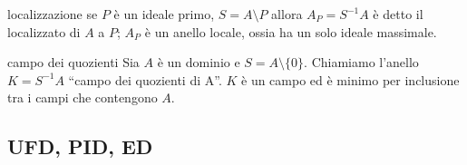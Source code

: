 \begin{definition}{localizzazione}
    se $P$ è un ideale primo, $S = A \setminus P$ allora $A_P = S^{-1}A$ è detto il localizzato di $A$ a $P$; $A_P$ è un anello locale, ossia ha un solo ideale massimale.
\end{definition}
\begin{definition}{campo dei quozienti}
    Sia $A$ è un dominio e $S = A \setminus \{0\}$. Chiamiamo l'anello $K = S^{-1}A$ ``campo dei quozienti di A''. $K$ è un campo ed è minimo per inclusione tra i campi che contengono $A$.
\end{definition}

\subsection{UFD, PID, ED}

